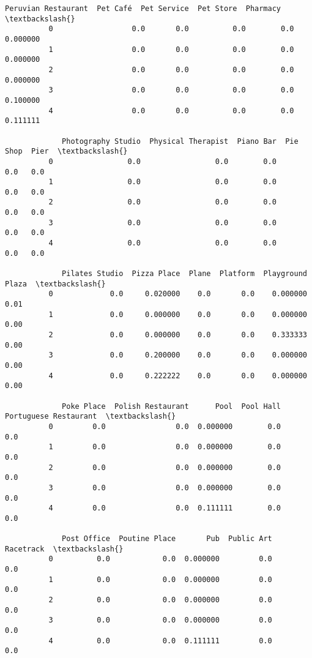 \documentclass[11pt]{article}
\begin{document}
\begin{Verbatim}[commandchars=\\\{\}]
             Peruvian Restaurant  Pet Café  Pet Service  Pet Store  Pharmacy  \textbackslash{}
          0                  0.0       0.0          0.0        0.0  0.000000   
          1                  0.0       0.0          0.0        0.0  0.000000   
          2                  0.0       0.0          0.0        0.0  0.000000   
          3                  0.0       0.0          0.0        0.0  0.100000   
          4                  0.0       0.0          0.0        0.0  0.111111   
          
             Photography Studio  Physical Therapist  Piano Bar  Pie Shop  Pier  \textbackslash{}
          0                 0.0                 0.0        0.0       0.0   0.0   
          1                 0.0                 0.0        0.0       0.0   0.0   
          2                 0.0                 0.0        0.0       0.0   0.0   
          3                 0.0                 0.0        0.0       0.0   0.0   
          4                 0.0                 0.0        0.0       0.0   0.0   
          
             Pilates Studio  Pizza Place  Plane  Platform  Playground  Plaza  \textbackslash{}
          0             0.0     0.020000    0.0       0.0    0.000000   0.01   
          1             0.0     0.000000    0.0       0.0    0.000000   0.00   
          2             0.0     0.000000    0.0       0.0    0.333333   0.00   
          3             0.0     0.200000    0.0       0.0    0.000000   0.00   
          4             0.0     0.222222    0.0       0.0    0.000000   0.00   
          
             Poke Place  Polish Restaurant      Pool  Pool Hall  Portuguese Restaurant  \textbackslash{}
          0         0.0                0.0  0.000000        0.0                    0.0   
          1         0.0                0.0  0.000000        0.0                    0.0   
          2         0.0                0.0  0.000000        0.0                    0.0   
          3         0.0                0.0  0.000000        0.0                    0.0   
          4         0.0                0.0  0.111111        0.0                    0.0   
          
             Post Office  Poutine Place       Pub  Public Art  Racetrack  \textbackslash{}
          0          0.0            0.0  0.000000         0.0        0.0   
          1          0.0            0.0  0.000000         0.0        0.0   
          2          0.0            0.0  0.000000         0.0        0.0   
          3          0.0            0.0  0.000000         0.0        0.0   
          4          0.0            0.0  0.111111         0.0        0.0   
          

\end{Verbatim}
\end{document}
